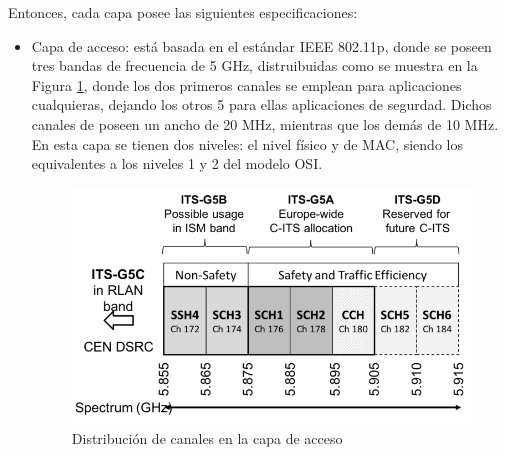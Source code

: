 \par Entonces, cada capa posee las siguientes especificaciones:

\begin{itemize}
	\item Capa de acceso: está basada en el estándar IEEE 802.11p, donde se poseen tres bandas de frecuencia de 5 GHz, distruibuidas como se muestra en la Figura \ref{fig:fisi}, donde los dos primeros canales se emplean para aplicaciones cualquieras, dejando los otros 5 para ellas aplicaciones de segurdad. Dichos canales de poseen un ancho de 20 MHz, mientras que los demás de 10 MHz. En esta capa se tienen dos niveles: el nivel físico y de MAC, siendo los equivalentes a los niveles 1 y 2 del modelo OSI.\\

\begin{figure}[!h]
	\centering
		\includegraphics[scale=0.7]{Imagenes/fisi}
		\caption{Distribución de canales en la capa de acceso \cite{festag2014cooperative}}
		\label{fig:fisi}
	\end{figure}	


\end{itemize}
